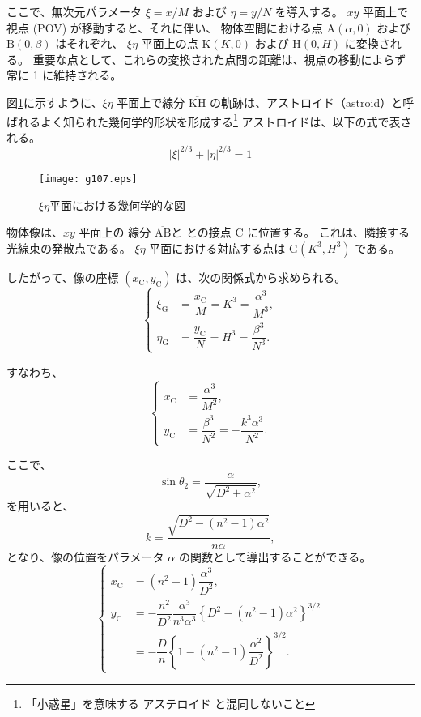 \documentclass[twocolumn]{article}
\begin{document}
ここで、無次元パラメータ $\xi=x/M$ および $\eta=y/N$ を導入する。 
$xy$ 平面上で視点 (POV) が移動すると、それに伴い、 
物体空間における点 $\mathrm{A}(\alpha, 0)$ および $\mathrm{B}(0, \beta)$ はそれぞれ、 
$\xi\eta$ 平面上の点 $\mathrm{K}(K, 0)$ および $\mathrm{H}(0, H)$ に変換される。 
重要な点として、これらの変換された点間の距離は、視点の移動によらず常に 1 に維持される。

図\ref{fig:astroid}に示すように、$\xi\eta$ 平面上で線分 $\overline{\mathrm{KH}}$ の軌跡は、アストロイド（astroid）と呼ばれるよく知られた幾何学的形状を形成する\footnote{「小惑星」を意味する アステロイド と混同しないこと} 
アストロイドは、以下の式で表される。
$$ \left| \xi \right|^{2/3} + \left| \eta \right|^{2/3} = 1 $$

\begin{figure}
	\centering
	\texttt{[image: g107.eps]}
	\caption{$\xi\eta$平面における幾何学的な図}
	\label{fig:astroid}
\end{figure}

物体像は、$xy$ 平面上の 線分 $\overline{\mathrm{AB}}$と との接点 C に位置する。 
これは、隣接する光線束の発散点である。 
$\xi\eta$ 平面における対応する点は $\mathrm{G}(K^3, H^3)$ である。

したがって、像の座標 $(x_{\mathrm{C}}^{}, y_{\mathrm{C}}^{})$ は、次の関係式から求められる。
$$ \left\{ 
\begin{aligned}
	\xi_{\mathrm{G}}^{} &= \dfrac{x_{\mathrm{C}}^{}}{M} = K^3 = \dfrac{\alpha^3}{M^3},\\
	\eta_{\mathrm{G}}^{} &= \dfrac{y_{\mathrm{C}}^{}}{N} = H^3 = \dfrac{\beta^3}{N^3}.
\end{aligned}
\right.$$

すなわち、
$$ \left\{ 
\begin{aligned}
	x_{\mathrm{C}}^{} &= \dfrac{\alpha^3}{M^2},\\
	y_{\mathrm{C}}^{} &= \dfrac{\beta^3}{N^2}=-\dfrac{k^3\alpha^3}{N^2}.
\end{aligned}
\right.$$

ここで、
$$\sin\theta_2 = \dfrac{\alpha}{\sqrt{D^2+\alpha^2}},$$
を用いると、
$$k = \dfrac{\sqrt{D^2-(n^2-1)\alpha^2}}{n\alpha},$$
となり、像の位置をパラメータ $\alpha$ の関数として導出することができる。
$$ \left\{ 
\begin{aligned}
	x_{\mathrm{C}}^{} &= (n^2-1)\dfrac{\alpha^3}{D^2},\\
	y_{\mathrm{C}}^{} &= -\dfrac{n^2}{D^2}\dfrac{\alpha^3}{n^3\alpha^3}\left\{ D^2-(n^2-1)\alpha^2 \right\}^{3/2}\\
	&=-\dfrac{D}{n}\left\{ 1-(n^2-1)\dfrac{\alpha^2}{D^2} \right\}^{3/2}.
\end{aligned}
\right.$$
\end{document}
